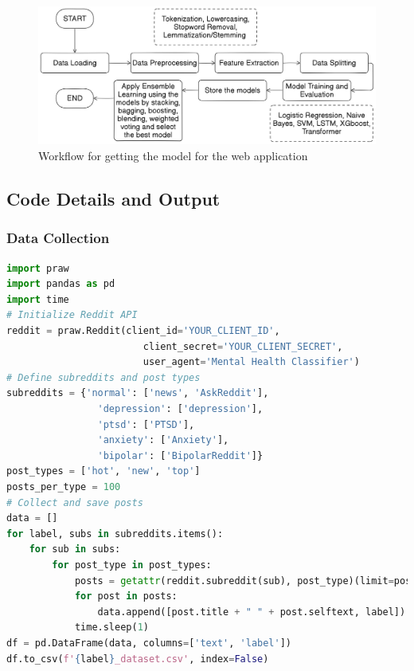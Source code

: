 \begin{figure}[h!]  
    \centering
    \includegraphics[width=1.0\textwidth]{Images/ML Model Workflow.png}  
    \caption{Workflow for getting the model for the web application}
    \label{model workflow}  %
\end{figure}


\subsection{Code Details and Output}

\subsubsection{Data Collection}

\begin{tcolorbox}[colback=gray!5!white, colframe=gray!80!black, boxrule=0.5pt, title=Collecting Reddit Posts]
    \begin{lstlisting}[language=Python]
import praw
import pandas as pd
import time
# Initialize Reddit API
reddit = praw.Reddit(client_id='YOUR_CLIENT_ID',
                        client_secret='YOUR_CLIENT_SECRET',
                        user_agent='Mental Health Classifier')
# Define subreddits and post types
subreddits = {'normal': ['news', 'AskReddit'], 
                'depression': ['depression'], 
                'ptsd': ['PTSD'], 
                'anxiety': ['Anxiety'], 
                'bipolar': ['BipolarReddit']}
post_types = ['hot', 'new', 'top']
posts_per_type = 100
# Collect and save posts
data = []
for label, subs in subreddits.items():
    for sub in subs:
        for post_type in post_types:
            posts = getattr(reddit.subreddit(sub), post_type)(limit=posts_per_type)
            for post in posts:
                data.append([post.title + " " + post.selftext, label])
            time.sleep(1)
df = pd.DataFrame(data, columns=['text', 'label'])
df.to_csv(f'{label}_dataset.csv', index=False)
    \end{lstlisting}
    \end{tcolorbox}
    
